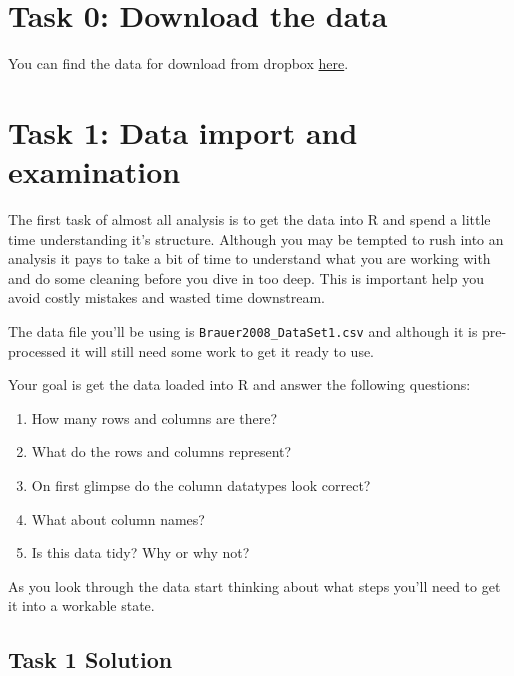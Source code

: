 \documentclass[]{book}
\providecommand{\tightlist}{%
  \setlength{\itemsep}{0pt}\setlength{\parskip}{0pt}}
\begin{document}
\hypertarget{task-0-download-the-data}{%
\section*{Task 0: Download the data}\label{task-0-download-the-data}}

You can find the data for download from dropbox \href{https://www.dropbox.com/s/z0c72rmzaqfr6ma/Brauer2008_DataSet1.csv?dl=0}{here}.

\hypertarget{task-1-data-import-and-examination}{%
\section*{Task 1: Data import and examination}\label{task-1-data-import-and-examination}}

The first task of almost all analysis is to get the data into R and spend a little time understanding it's structure. Although you may be tempted to rush into an analysis it pays to take a bit of time to understand what you are working with and do some cleaning before you dive in too deep. This is important help you avoid costly mistakes and wasted time downstream.

The data file you'll be using is \texttt{Brauer2008\_DataSet1.csv} and although it is pre-processed it will still need some work to get it ready to use.

Your goal is get the data loaded into R and answer the following questions:

\begin{enumerate}
\def\labelenumi{\arabic{enumi}.}
\tightlist
\item
  How many rows and columns are there?
\item
  What do the rows and columns represent?
\item
  On first glimpse do the column datatypes look correct?
\item
  What about column names?
\item
  Is this data tidy? Why or why not?
\end{enumerate}

As you look through the data start thinking about what steps you'll need to get it into a workable state.

\hypertarget{task-1-solution}{%
\subsection*{Task 1 Solution}\label{task-1-solution}}
\end{document}
